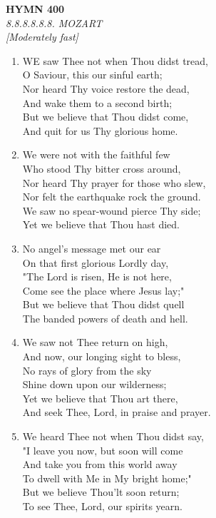 \newpage
\begin{center}
    {\Large \textbf{HYMN 400}}
    \\
    \textit{8.8.8.8.8.8. MOZART}
    \\
    \textit{\small [Moderately fast]}
\end{center}
\vspace{1em}

\begin{enumerate}
    \item WE saw Thee not when Thou didst tread, \\
        O Saviour, this our sinful earth; \\
        Nor heard Thy voice restore the dead, \\
        And wake them to a second birth; \\
        But we believe that Thou didst come, \\
        And quit for us Thy glorious home.

    \item We were not with the faithful few \\
        Who stood Thy bitter cross around, \\
        Nor heard Thy prayer for those who slew, \\
        Nor felt the earthquake rock the ground. \\
        We saw no spear-wound pierce Thy side; \\
        Yet we believe that Thou hast died.

    \item No angel's message met our ear \\
        On that first glorious Lordly day, \\
        "The Lord is risen, He is not here, \\
        Come see the place where Jesus lay;" \\
        But we believe that Thou didst quell \\
        The banded powers of death and hell.

    \item We saw not Thee return on high, \\
        And now, our longing sight to bless, \\
        No rays of glory from the sky \\
        Shine down upon our wilderness; \\
        Yet we believe that Thou art there, \\
        And seek Thee, Lord, in praise and prayer.

    \item We heard Thee not when Thou didst say, \\
        "I leave you now, but soon will come \\
        And take you from this world away \\
        To dwell with Me in My bright home;" \\
        But we believe Thou'lt soon return; \\
        To see Thee, Lord, our spirits yearn.

\end{enumerate}

